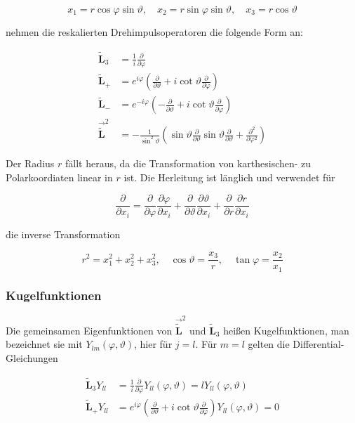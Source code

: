 \documentclass[10pt, letterpaper]{article}
\begin{document}
$$
x_{1}=r \cos \varphi \sin \vartheta, \quad x_{2}=r \sin \varphi \sin \vartheta, \quad x_{3}=r \cos \vartheta
$$

nehmen die reskalierten Drehimpulsoperatoren die folgende Form an:

$$
\begin{aligned}
\tilde{\mathbf{L}}_{3} & =\frac{1}{i} \frac{\partial}{\partial \varphi} \\
\tilde{\mathbf{L}}_{+} & =e^{i \varphi}\left(\frac{\partial}{\partial \vartheta}+i \cot \vartheta \frac{\partial}{\partial \varphi}\right) \\
\tilde{\mathbf{L}}_{-} & =e^{-i \varphi}\left(-\frac{\partial}{\partial \vartheta}+i \cot \vartheta \frac{\partial}{\partial \varphi}\right) \\
\overrightarrow{\tilde{\mathbf{L}}}^{2} & =-\frac{1}{\sin ^{2} \vartheta}\left(\sin \vartheta \frac{\partial}{\partial \vartheta} \sin \vartheta \frac{\partial}{\partial \vartheta}+\frac{\partial^{2}}{\partial \varphi^{2}}\right)
\end{aligned}
$$

Der Radius $r$ fällt heraus, da die Transformation von karthesischen- zu Polarkoordiaten linear in $r$ ist. Die Herleitung ist länglich und verwendet für

$$
\frac{\partial}{\partial x_{i}}=\frac{\partial}{\partial \varphi} \frac{\partial \varphi}{\partial x_{i}}+\frac{\partial}{\partial \vartheta} \frac{\partial \vartheta}{\partial x_{i}}+\frac{\partial}{\partial r} \frac{\partial r}{\partial x_{i}}
$$

die inverse Transformation

$$
r^{2}=x_{1}^{2}+x_{2}^{2}+x_{3}^{2}, \quad \cos \vartheta=\frac{x_{3}}{r}, \quad \tan \varphi=\frac{x_{2}}{x_{1}}
$$

\subsubsection*{Kugelfunktionen}
Die gemeinsamen Eigenfunktionen von $\overrightarrow{\tilde{\mathbf{L}}}^{2}$ und $\tilde{\mathbf{L}}_{3}$ heißen Kugelfunktionen, man bezeichnet sie mit $Y_{l m}(\varphi, \vartheta)$, hier für $j=l$. Für $m=l$ gelten die Differential-Gleichungen

$$
\begin{aligned}
\tilde{\mathbf{L}}_{3} Y_{l l} & =\frac{1}{i} \frac{\partial}{\partial \varphi} Y_{l l}(\varphi, \vartheta)=l Y_{l l}(\varphi, \vartheta) \\
\tilde{\mathbf{L}}_{+} Y_{l l} & =e^{i \varphi}\left(\frac{\partial}{\partial \vartheta}+i \cot \vartheta \frac{\partial}{\partial \varphi}\right) Y_{l l}(\varphi, \vartheta)=0
\end{aligned}
$$
\end{document}
